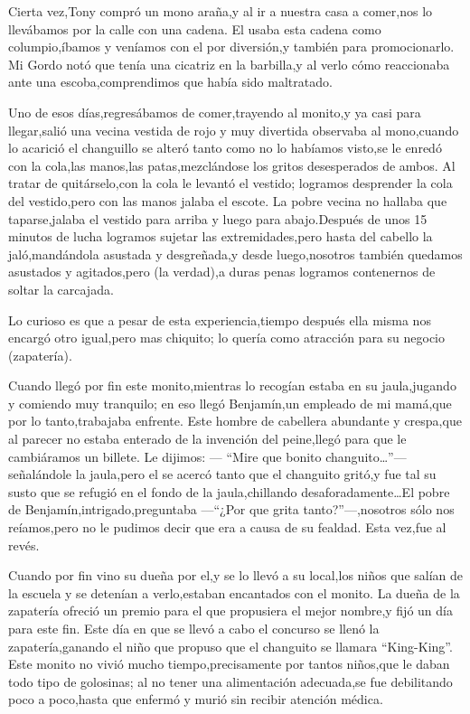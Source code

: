\documentclass[letterpaper,12pt]{book}
\begin{document}
Cierta vez,Tony compró un mono araña,y al ir a nuestra casa a comer,nos lo llevábamos por la calle con una cadena. El usaba esta cadena como columpio,íbamos y veníamos con el por diversión,y también para promocionarlo. Mi Gordo notó que tenía una cicatriz en la barbilla,y al verlo cómo reaccionaba ante una escoba,comprendimos que había sido maltratado.

Uno de esos días,regresábamos de comer,trayendo al monito,y ya casi para llegar,salió una vecina vestida de rojo y muy divertida observaba al mono,cuando lo acarició el changuillo se alteró tanto como no lo habíamos visto,se le enredó con la cola,las manos,las patas,mezclándose los gritos desesperados de ambos. Al tratar de quitárselo,con la cola le levantó el vestido; logramos desprender la cola del vestido,pero con las manos jalaba el escote. La pobre vecina no hallaba que taparse,jalaba el vestido para arriba y luego para abajo.Después de unos 15 minutos de lucha logramos sujetar las extremidades,pero hasta del cabello la jaló,mandándola asustada y desgreñada,y desde luego,nosotros también quedamos asustados y agitados,pero (la verdad),a duras penas logramos contenernos de soltar la carcajada.

Lo curioso es que a pesar de esta experiencia,tiempo después ella misma nos encargó otro igual,pero mas chiquito; lo quería como atracción para su negocio (zapatería).

Cuando llegó por fin este monito,mientras lo recogían estaba en su jaula,jugando y comiendo muy tranquilo; en eso llegó Benjamín,un empleado de mi mamá,que por lo tanto,trabajaba enfrente. Este hombre de cabellera abundante y crespa,que al parecer no estaba enterado de la invención del peine,llegó para que le cambiáramos un billete. Le dijimos: --- ``Mire que bonito changuito\ldots''--- señalándole la jaula,pero el se acercó tanto que el changuito gritó,y fue tal su susto que se refugió en el fondo de la jaula,chillando desaforadamente\ldots El pobre de Benjamín,intrigado,preguntaba ---``¿Por que grita tanto?''---,nosotros sólo nos reíamos,pero no le pudimos decir que era a causa de su fealdad. Esta vez,fue al revés.

Cuando por fin vino su dueña por el,y se lo llevó a su local,los niños que salían de la escuela y se detenían a verlo,estaban encantados con el monito. La dueña de la zapatería ofreció un premio para el que propusiera el mejor nombre,y fijó un día para este fin.
Este día en que se llevó a cabo el concurso se llenó la zapatería,ganando el niño que propuso que el changuito se llamara ``King-King''.  Este monito no vivió mucho tiempo,precisamente por tantos niños,que le daban todo tipo de golosinas; al no tener una alimentación adecuada,se fue debilitando poco a poco,hasta que enfermó y murió sin recibir atención médica.
\end{document}
